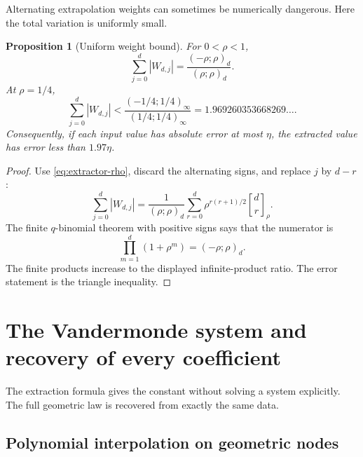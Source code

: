 \documentclass[11pt,oneside]{article}
\numberwithin{equation}{section}
\newtheorem{proposition}[theorem]{Proposition}
\theoremstyle{definition}
\theoremstyle{remark}
\newcommand{\abs}[1]{\left|#1\right|}
\newcommand{\qbinom}[3]{\genfrac{[}{]}{0pt}{}{#1}{#2}_{#3}}
\begin{document}
Alternating extrapolation weights can sometimes be numerically dangerous.  Here
the total variation is uniformly small.

\begin{proposition}[Uniform weight bound]
For $0<\rho<1$,
\begin{equation}
 \sum_{j=0}^{d}\abs{W_{d,j}}
 =\frac{(-\rho;\rho)_d}{(\rho;\rho)_d}.
 \label{eq:weight-variation}
\end{equation}
At $\rho=1/4$,
\begin{equation}
 \sum_{j=0}^{d}\abs{W_{d,j}}
 <\frac{(-1/4;1/4)_\infty}{(1/4;1/4)_\infty}
 =1.969260353668269\ldots.
 \label{eq:weight-bound-numeric}
\end{equation}
Consequently, if each input value has absolute error at most $\eta$, the
extracted value has error less than $1.97\eta$.
\end{proposition}

\begin{proof}
Use \eqref{eq:extractor-rho}, discard the alternating signs, and replace
$j$ by $d-r$:
\[
 \sum_{j=0}^{d}\abs{W_{d,j}}
 =\frac1{(\rho;\rho)_d}
 \sum_{r=0}^{d}\rho^{r(r+1)/2}\qbinom{d}{r}{\rho}.
\]
The finite $q$-binomial theorem with positive signs says that the numerator is
\[
 \prod_{m=1}^{d}(1+\rho^m)=(-\rho;\rho)_d.
\]
The finite products increase to the displayed infinite-product ratio.  The
error statement is the triangle inequality.
\end{proof}

\section{The Vandermonde system and recovery of every coefficient}

The extraction formula gives the constant without solving a system explicitly.
The full geometric law is recovered from exactly the same data.

\subsection{Polynomial interpolation on geometric nodes}
\end{document}
